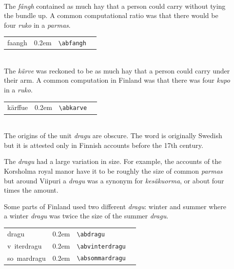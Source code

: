 \documentclass[a4paper]{article}
\newcommand{\samplefont}{\fontsize{16}{16}\abcursivefamily\spaceskip0.2em}
\newcommand{\sample}[1]{{\samplefont #1 \strut}}
\newcommand{\ltxncmd}[1]{\texttt{\textbackslash{}#1}}
\begin{document}
\begin{description}
\item [\sample{faangh} \emph{fångh}, \emph{ruko}] \mbox{} \\
  The \emph{fångh} contained as much hay that a person could carry
  without tying the bundle up. A common computational ratio was that
  there would be four \emph{ruko} in a \emph{parmas}.
  \begin{center}
    \begin{tabular}{llll}
      {}faangh & \sample{\abfangh} & \ltxncmd{abfangh} \\
    \end{tabular}
  \end{center}

\item [\sample{kärffue} \emph{kärve}, \emph{kupo}] \mbox{} \\
  The \emph{kärve} was reckoned to be as much hay that a person could
  carry under their arm. A common computation in Finland was that
  there was four \emph{kupo} in a \emph{ruko}.
  \begin{center}
    \begin{tabular}{llll}
      {}kärffue & \sample{\abkarve} & \ltxncmd{abkarve} \\
    \end{tabular}
  \end{center}


\item [\sample{dragu} \emph{dragu}] \mbox{} \\
  The origins of the unit \emph{dragu} are obscure. The word is
  originally Swedish but it is attested only in Finnish accounts
  before the 17th century.
  
  The \emph{dragu} had a large variation in size. For example, the
  accounts of the Korsholma royal manor have it to be roughly the size
  of common \emph{parmas} but around Viipuri a \emph{dragu} was a
  synonym for \emph{kesäkuorma}, or about four times the amount. 

  Some parts of Finland used two different \emph{dragu}: winter and
  summer where a winter \emph{dragu} was twice the size of the summer
  \emph{dragu}.

  \begin{center}
    \begin{tabular}{llll}
      {}dragu & \sample{\abdragu} & \ltxncmd{abdragu} \\
      {}v~iterdragu & \sample{\abvinterdragu} & \ltxncmd{abvinterdragu} \\
      {}so~mardragu & \sample{\absommardragu} & \ltxncmd{absommardragu} \\
    \end{tabular}
  \end{center}
  


\end{description}
\end{document}
